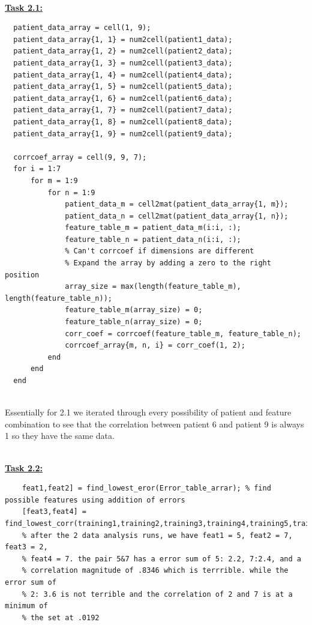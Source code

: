 \documentclass{article}
\begin{document}
  \\  \underline{\textbf{Task 2.1:}}
  \begin{lstlisting}
  patient_data_array = cell(1, 9);
  patient_data_array{1, 1} = num2cell(patient1_data);
  patient_data_array{1, 2} = num2cell(patient2_data);
  patient_data_array{1, 3} = num2cell(patient3_data);
  patient_data_array{1, 4} = num2cell(patient4_data);
  patient_data_array{1, 5} = num2cell(patient5_data);
  patient_data_array{1, 6} = num2cell(patient6_data);
  patient_data_array{1, 7} = num2cell(patient7_data);
  patient_data_array{1, 8} = num2cell(patient8_data);
  patient_data_array{1, 9} = num2cell(patient9_data);

  corrcoef_array = cell(9, 9, 7);
  for i = 1:7
      for m = 1:9
          for n = 1:9
              patient_data_m = cell2mat(patient_data_array{1, m});
              patient_data_n = cell2mat(patient_data_array{1, n});
              feature_table_m = patient_data_m(i:i, :);
              feature_table_n = patient_data_n(i:i, :);
              % Can't corrcoef if dimensions are different
              % Expand the array by adding a zero to the right position
              array_size = max(length(feature_table_m), length(feature_table_n));
              feature_table_m(array_size) = 0;
              feature_table_n(array_size) = 0;
              corr_coef = corrcoef(feature_table_m, feature_table_n);
              corrcoef_array{m, n, i} = corr_coef(1, 2);
          end
      end
  end
  \end{lstlisting}
  \\ Essentially for 2.1 we iterated through every possibility of patient and feature combination to see that the correlation between patient 6 and patient 9 is always 1 so they have the same data.

  \\  \underline{\textbf{Task 2.2:}}
  \begin{lstlisting}
    feat1,feat2] = find_lowest_eror(Error_table_arrar); % find possible features using addition of errors
    [feat3,feat4] = find_lowest_corr(training1,training2,training3,training4,training5,training6,training7,training8,training9);
    % after the 2 data analysis runs, we have feat1 = 5, feat2 = 7, feat3 = 2,
    % feat4 = 7. the pair 5&7 has a error sum of 5: 2.2, 7:2.4, and a
    % correlation magnitude of .8346 which is terrrible. while the error sum of
    % 2: 3.6 is not terrible and the correlation of 2 and 7 is at a minimum of
    % the set at .0192
  \end{lstlisting}
\end{document}
